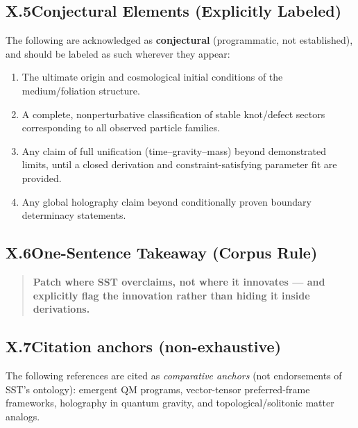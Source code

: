 \documentclass[11pt]{article}
\begin{document}
        \subsection*{X.5\quad Conjectural Elements (Explicitly Labeled)}
            The following are acknowledged as \textbf{conjectural} (programmatic, not established), and should be labeled as such wherever they appear:
            \begin{enumerate}
                \item The ultimate origin and cosmological initial conditions of the medium/foliation structure.
                \item A complete, nonperturbative classification of stable knot/defect sectors corresponding to all observed particle families.
                \item Any claim of full unification (time--gravity--mass) beyond demonstrated limits, until a closed derivation and constraint-satisfying parameter fit are provided.
                \item Any global holography claim beyond conditionally proven boundary determinacy statements.
            \end{enumerate}

        \subsection*{X.6\quad One-Sentence Takeaway (Corpus Rule)}
            \begin{quote}
                \noindent\textbf{Patch where SST overclaims, not where it innovates --- and explicitly flag the innovation rather than hiding it inside derivations.}
            \end{quote}

        \subsection*{X.7\quad Citation anchors (non-exhaustive)}
            \noindent The following references are cited as \emph{comparative anchors} (not endorsements of SST’s ontology): emergent QM programs, vector-tensor preferred-frame frameworks, holography in quantum gravity, and topological/solitonic matter analogs.
\end{document}
